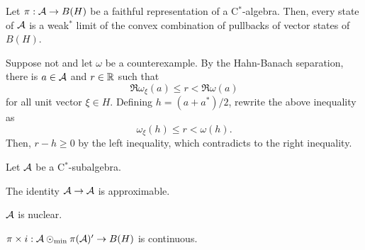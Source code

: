 \documentclass{../../small}
\begin{document}
\begin{lem}
Let $\pi:\mathcal{A}\to B(H)$ be a faithful representation of a C$^*$-algebra.
Then, every state of $\mathcal{A}$ is a weak$^*$ limit of the convex combination of pullbacks of vector states of $B(H)$.
\end{lem}
\begin{pf}
Suppose not and let $\omega$ be a counterexample.
By the Hahn-Banach separation, there is $a\in\mathcal{A}$ and $r\in\mathbb{R}$ such that
\[\Re\omega_\xi(a)\le r<\Re\omega(a)\]
for all unit vector $\xi\in H$.
Defining $h=(a+a^*)/2$, rewrite the above inequality as
\[\omega_\xi(h)\le r<\omega(h).\]
Then, $r-h\ge0$ by the left inequality, which contradicts to the right inequality.
\end{pf}

\begin{thm}
Let $\mathcal{A}$ be a C$^*$-subalgebra.
\begin{parts}
\item The identity $\mathcal{A}\to\mathcal{A}$ is approximable.
\item $\mathcal{A}$ is nuclear.
\item $\pi\times i:\mathcal{A}\odot_{\min}\pi(\mathcal{A})'\to B(H)$ is continuous.
\end{parts}
\end{thm}
\end{document}
